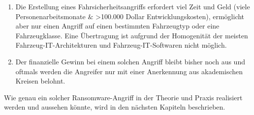 \begin{enumerate}
    \item Die Erstellung eines Fahrsicherheitsangriffs erfordert viel Zeit und Geld (viele 
    Personenarbeitsmonate $\&$ \textgreater100.000 Dollar Entwicklungskosten), ermöglicht aber nur einen Angriff auf einen 
    bestimmten Fahrzeugtyp oder eine Fahrzeugklasse. 
    Eine Übertragung ist aufgrund der Homogenität der meisten Fahrzeug-IT-Architekturen und 
    Fahrzeug-IT-Softwaren nicht möglich.
    \item Der finanzielle Gewinn bei einem solchen Angriff bleibt bisher noch aus und oftmals 
    werden die Angreifer nur mit einer Anerkennung aus akademischen Kreisen belohnt. 
\end{enumerate}

Wie genau ein solcher Ransomware-Angriff in der Theorie und Praxis realisiert werden und 
aussehen könnte, wird in den nächsten Kapiteln beschrieben.

